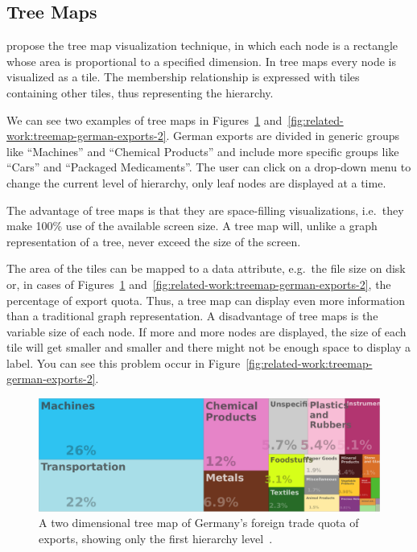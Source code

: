 \subsection{Tree Maps}
\textcite{Johnson1991} propose the tree map visualization technique, in which each node is a rectangle whose area is proportional to a specified dimension.
In tree maps every node is visualized as a tile.
The membership relationship is expressed with tiles containing other tiles, thus representing the hierarchy.

We can see two examples of tree maps in Figures~\ref{fig:related-work:treemap-german-exports-1} and~\ref{fig:related-work:treemap-german-exports-2}.
German exports are divided in generic groups like ``Machines'' and ``Chemical Products'' and include more specific groups like ``Cars'' and ``Packaged Medicaments''.
The user can click on a drop-down menu to change the current level of hierarchy, only leaf nodes are displayed at a time.

The advantage of tree maps is that they are space-filling visualizations, i.e.\ they make 100\% use of the available screen size.
A tree map will, unlike a graph representation of a tree, never exceed the size of the screen.

The area of the tiles can be mapped to a data attribute, e.g.\ the file size on disk or, in cases of Figures~\ref{fig:related-work:treemap-german-exports-1} and~\ref{fig:related-work:treemap-german-exports-2}, the percentage of export quota.
Thus, a tree map can display even more information than a traditional graph representation.
A disadvantage of tree maps is the variable size of each node.
If more and more nodes are displayed, the size of each tile will get smaller and smaller and there might not be enough space to display a label.
You can see this problem occur in Figure~\ref{fig:related-work:treemap-german-exports-2}.
\begin{figure}[ht]
    \centering
    \includegraphics[width=\textwidth]{figures/related-work/en_profile_country_deu_1}
    \caption{A two dimensional tree map of Germany's foreign trade quota of exports, showing only the first hierarchy level~\parencite{Observatory2017}.}
    \label{fig:related-work:treemap-german-exports-1}
\end{figure}

